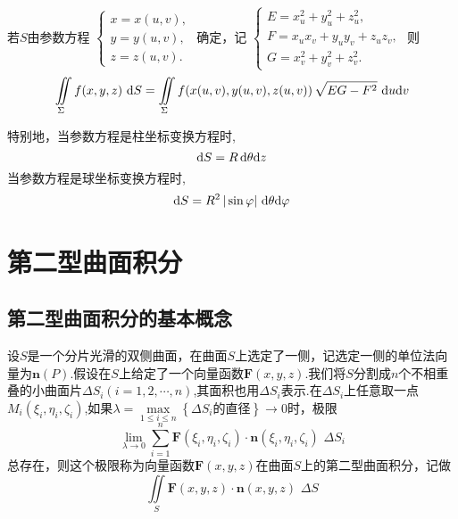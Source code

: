 \theorem[参数方程下第一型曲面积分的计算]
若$S$由参数方程
$
\begin{cases}
	x = x(u,v),\\
	y = y(u,v),\\
	z= z(u,v).
\end{cases}
$
确定，记
$
\begin{cases}
	E = x_u^2 + y_u^2 +z_u^2,\\
	F = x_ux_v + y_uy_v + z_uz_v,\\
	G = x_v^2 + y_v^2 +z_v^2.
\end{cases}
$
则
\begin{equation}
	\iint\limits_{\Sigma}f(x,y,z)\,\,{\rm{d}} S =\iint\limits_{\Sigma}f(x(u,v),y(u,v),z(u,v))\,\sqrt{EG-F^2}\,\,{\rm{d}} u {\rm{d}} v
\end{equation}
\par 特别地，当参数方程是柱坐标变换方程时,
\begin{equation}
	{\rm{d}} S = R \,{\rm{d}} \theta {\rm{d}} z
\end{equation}
当参数方程是球坐标变换方程时,
\begin{equation}
	{\rm{d}} S = R^2\,|\sin \varphi| \,\,{\rm{d}} \theta {\rm{d}} \varphi
\end{equation}

\section{第二型曲面积分}
\subsection{第二型曲面积分的基本概念}
设$S$是一个分片光滑的双侧曲面，在曲面$S$上选定了一侧，记选定一侧的单位法向量为$\bm{n}(P)$.假设在$S$上给定了一个向量函数$\bm{F}(x,y,z)$.我们将$S$分割成$n$个不相重叠的小曲面片$\Delta S_i(i=1,2,\cdots,n)$,其面积也用$\Delta S_i$表示.在$\Delta S_i$上任意取一点$M_i(\xi_i,\eta_i,\zeta_i)$,如果$\lambda = \max\limits_{1 \le i \le n} \left\lbrace \Delta S_i\mbox{的直径}\right\rbrace \rightarrow 0$时，极限
\begin{equation}
	\lim_{\lambda \rightarrow 0} \sum^{n}_{i=1} \bm{F}(\xi_i,\eta_i,\zeta_i)\cdot \bm{n}(\xi_i,\eta_i,\zeta_i)\,\,\Delta S_i
\end{equation}
总存在，则这个极限称为向量函数$\bm{F}(x,y,z)$在曲面$S$上的第二型曲面积分，记做
\begin{equation}
	\iint\limits_{S} \bm{F}(x,y,z)\cdot \bm{n}(x,y,z)\,\,\Delta S
\end{equation}

